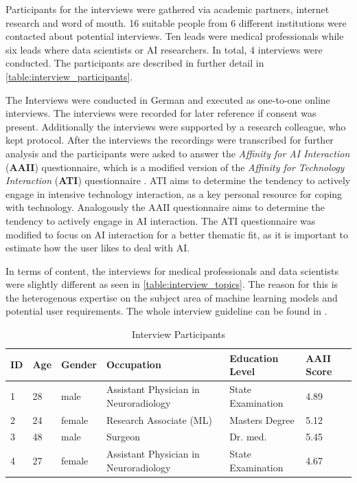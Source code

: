 \documentclass[11pt,a4paper,english]{scrreprt}
\begin{document}
Participants for the interviews were gathered via academic partners, internet research and word of mouth. 16 suitable people from 6 different institutions were contacted about potential interviews. Ten leads were medical professionals while six leads where data scientists or AI researchers. In total, 4 interviews were conducted. The participants are described in further detail in \autoref{table:interview_participants}.

The Interviews were conducted in German and executed as one-to-one online interviews. The interviews were recorded for later reference if consent was present. Additionally the interviews were supported by a research colleague, who kept protocol. After the interviews the recordings were transcribed for further analysis and the participants were asked to answer the \textit{Affinity for AI Interaction} (\textbf{AAII}) questionnaire, which is a modified version of the \textit{Affinity for Technology Interaction} (\textbf{ATI}) questionnaire \parencite{franke_personal_2019}. ATI aims to determine the tendency to actively engage in intensive technology interaction, as a key personal resource for coping with technology. Analogously the AAII questionnaire aims to determine the tendency to actively engage in AI interaction. The ATI questionnaire was modified to focus on AI interaction for a better thematic fit, as it is important to estimate how the user likes to deal with AI.

In terms of content, the interviews for medical professionals and data scientists were slightly different as seen in \autoref{table:interview_topics}. The reason for this is the heterogenous expertise on the subject area of machine learning models and potential user requirements. The whole interview guideline can be found in .

\begin{table}[htbp]
    \centering
    \begin{tabularx}{\textwidth}{ l l l X X l }
        \toprule
        ID & Age & Gender & Occupation & Education Level & AAII Score \\
        \midrule
        1 & 28 & male & Assistant Physician in Neuroradiology & State Examination & 4.89 \\ 
        2 & 24 & female & Research Associate (ML) & Masters Degree & 5.12 \\ 
        3 & 48 & male & Surgeon & Dr. med. & 5.45 \\ 
        4 & 27 & female & Assistant Physician in Neuroradiology & State Examination & 4.67 \\ 
        \bottomrule
    \end{tabularx}
    \caption{Interview Participants}
    \label{table:interview_participants}
\end{table}
\end{document}
